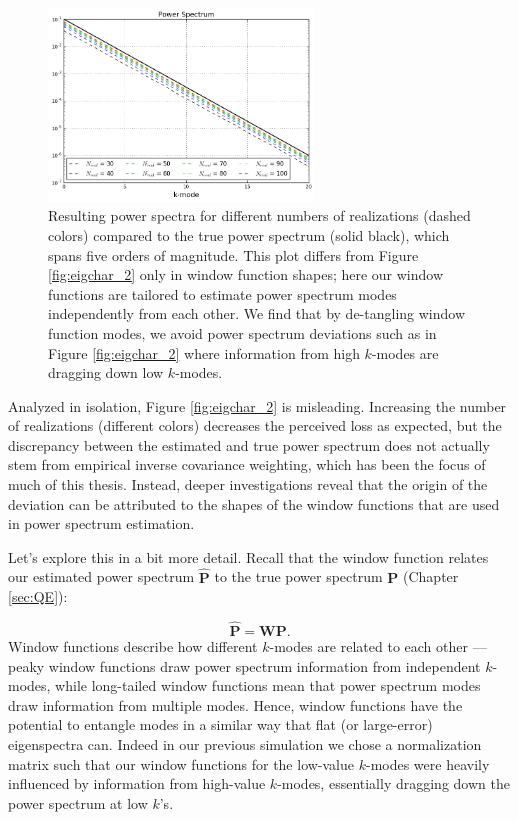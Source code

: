 \begin{figure}
    \centering
	\includegraphics[width=0.63\textwidth]{plots/eigchar_4.png}    
	\caption{Resulting power spectra for different numbers of realizations (dashed colors) compared to the true power spectrum (solid black), which spans five orders of magnitude. This plot differs from Figure \ref{fig:eigchar_2} only in window function shapes; here our window functions are tailored to estimate power spectrum modes independently from each other. We find that by de-tangling window function modes, we avoid power spectrum deviations such as in Figure \ref{fig:eigchar_2} where information from high $k$-modes are dragging down low $k$-modes.}
    \label{fig:eigchar_4}
\end{figure}

Analyzed in isolation, Figure \ref{fig:eigchar_2} is misleading. Increasing the number of realizations (different colors) decreases the perceived loss as expected, but the discrepancy between the estimated and true power spectrum does not actually stem from empirical inverse covariance weighting, which has been the focus of much of this thesis. Instead, deeper investigations reveal that the origin of the deviation can be attributed to the shapes of the window functions that are used in power spectrum estimation. 

Let's explore this in a bit more detail. Recall that the window function relates our estimated power spectrum $\widehat{\textbf{P}}$ to the true power spectrum $\textbf{P}$ (Chapter \ref{sec:QE}):

\begin{equation}
\widehat{\textbf{P}} = \textbf{W}\textbf{P}.
\end{equation}
Window functions describe how different $k$-modes are related to each other --- peaky window functions draw power spectrum information from independent $k$-modes, while long-tailed window functions mean that power spectrum modes draw information from multiple modes. Hence, window functions have the potential to entangle modes in a similar way that flat (or large-error) eigenspectra can. Indeed in our previous simulation we chose a normalization matrix such that our window functions for the low-value $k$-modes were heavily influenced by information from high-value $k$-modes, essentially dragging down the power spectrum at low $k$'s.


